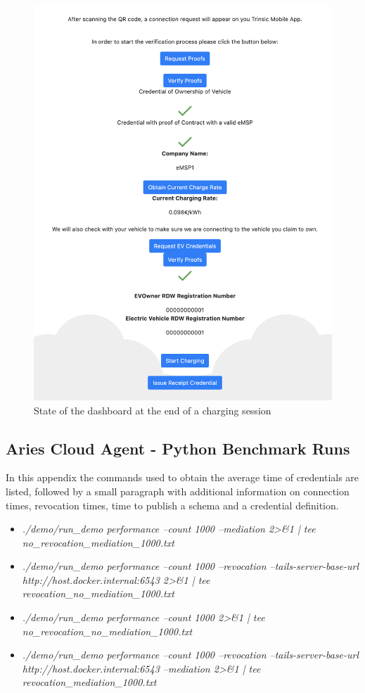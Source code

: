 \begin{figure}[H]
    \centering
    \includegraphics[width=0.6\linewidth]{images/Frontend/Charging/15.png}
    \caption[]{State of the dashboard at the end of a charging session}
    \label{fig:charging_screenshot_15}
\end{figure}

\newpage

\subsection{Aries Cloud Agent - Python Benchmark Runs}
\label{app:benchmark_runs}

In this appendix the commands used to obtain the average time of credentials are listed, followed by a small paragraph with additional information on connection times, revocation times, time to publish a schema and a credential definition.

\begin{itemize}
    \item \textit{./demo/run\_demo performance --count 1000 --mediation 2>\&1 | tee no\_revocation\_mediation\_1000.txt}
    \item \textit{./demo/run\_demo performance --count 1000 --revocation --tails-server-base-url http://host.docker.internal:6543 2>\&1 | tee revocation\_no\_mediation\_1000.txt }
    \item \textit{./demo/run\_demo performance --count 1000 2>\&1 | tee no\_revocation\_no\_mediation\_1000.txt}
    \item \textit{./demo/run\_demo performance --count 1000 --revocation --tails-server-base-url http://host.docker.internal:6543 --mediation 2>\&1 | tee revocation\_mediation\_1000.txt}
\end{itemize}

